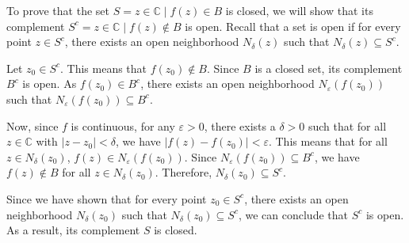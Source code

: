 To prove that the set $S = {z \in \mathbb{C} \mid f(z) \in B}$ is closed, we will show that its complement $S^c = {z \in \mathbb{C} \mid f(z) \notin B}$ is open. Recall that a set is open if for every point $z \in S^c$, there exists an open neighborhood $N_\delta(z)$ such that $N_\delta(z) \subseteq S^c$.

Let $z_0 \in S^c$. This means that $f(z_0) \notin B$. Since $B$ is a closed set, its complement $B^c$ is open. As $f(z_0) \in B^c$, there exists an open neighborhood $N_\varepsilon(f(z_0))$ such that $N_\varepsilon(f(z_0)) \subseteq B^c$.

Now, since $f$ is continuous, for any $\varepsilon > 0$, there exists a $\delta > 0$ such that for all $z \in \mathbb{C}$ with $|z - z_0| < \delta$, we have $|f(z) - f(z_0)| < \varepsilon$. This means that for all $z \in N_\delta(z_0)$, $f(z) \in N_\varepsilon(f(z_0))$. Since $N_\varepsilon(f(z_0)) \subseteq B^c$, we have $f(z) \notin B$ for all $z \in N_\delta(z_0)$. Therefore, $N_\delta(z_0) \subseteq S^c$.

Since we have shown that for every point $z_0 \in S^c$, there exists an open neighborhood $N_\delta(z_0)$ such that $N_\delta(z_0) \subseteq S^c$, we can conclude that $S^c$ is open. As a result, its complement $S$ is closed.

